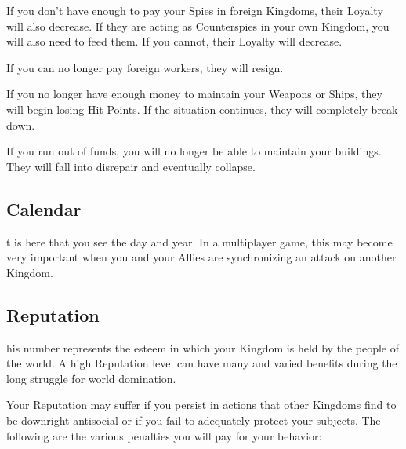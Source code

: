 If you don’t have enough to pay your Spies in foreign Kingdoms, their Loyalty will also decrease. If they are acting as Counterspies in your own Kingdom, you will also need to feed them. If you cannot, their Loyalty will decrease.

If you can no longer pay foreign workers, they will resign.

If you no longer have enough money to maintain your Weapons or Ships, they will begin losing Hit-Points. If the situation continues, they will completely break down.

If you run out of funds, you will no longer be able to maintain your buildings. They will fall into disrepair and eventually collapse.

\subsection{Calendar}


t is here that you see the day and year. In a multiplayer game, this may become very important when you and your Allies are synchronizing an attack on another Kingdom.

\subsection{Reputation}


his number represents the esteem in which your Kingdom is held by the people of the world. A high Reputation level can have many and varied benefits during the long struggle for world domination.

Your Reputation may suffer if you persist in actions that other Kingdoms find to be downright antisocial or if you fail to adequately protect your subjects. The following are the various penalties you will pay for your behavior:


